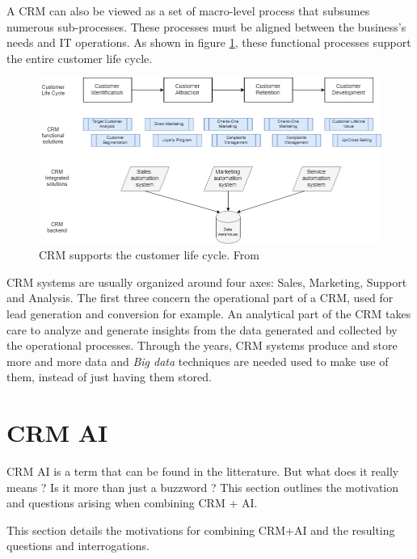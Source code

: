 A CRM can also be viewed as a set of macro-level process that subsumes numerous sub-processes\cite{crm-processes}. These processes must be aligned between the business's needs and IT operations. As shown in figure \ref{fig:crm-clc}, these functional processes support the entire customer life cycle.

\begin{figure}[h]
    \centering
    \includegraphics[width=12cm]{images/CRM-CustomerLifeCycle.png}
    \caption[CRM supports the customer life cycle]{CRM supports the customer life cycle. From \cite{DataAnalyticsinCRMProcessesALiteratureReview}}
    \label{fig:crm-clc}
\end{figure}

CRM systems are usually organized around four axes: Sales, Marketing, Support and Analysis\cite{crm-def}. The first three concern the operational part of a CRM, used for lead generation and conversion for example. An analytical part of the CRM takes care to analyze and generate insights from the data generated and collected by the operational processes. Through the years, CRM systems produce and store more and more data and \textit{Big data} techniques are needed used to make use of them, instead of just having them stored\cite{peel-et-al}.


\section{CRM AI}

CRM AI is a term that can be found in the litterature. But what does it really means ? Is it more than just a buzzword ? This section outlines the motivation and questions arising when combining CRM + AI.

This section details the motivations for combining CRM+AI and the resulting questions and interrogations.

